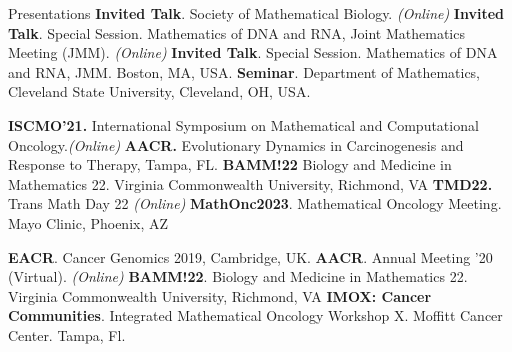 \begin{rubric}{Presentations}
\entry*[2021] \textbf{Invited Talk}. Society of Mathematical Biology. \emph{(Online)}
\entry*[2022] \textbf{Invited Talk}. Special Session. Mathematics of DNA and RNA, Joint Mathematics Meeting (JMM). \emph{(Online)}
\entry*[2023] \textbf{Invited Talk}. Special Session. Mathematics of DNA and RNA, JMM. Boston, MA, USA.
\entry*[2023] \textbf{Seminar}. Department of Mathematics, Cleveland State University, Cleveland, OH, USA.

\entry*[2021] \textbf{ISCMO'21. } International Symposium on Mathematical and Computational Oncology.\emph{(Online)}
\entry*[2022] \textbf{AACR. }Evolutionary Dynamics in Carcinogenesis and Response to Therapy, Tampa, FL. 
\entry*[2022] \textbf{BAMM!22} Biology and Medicine in Mathematics 22. Virginia Commonwealth University, Richmond, VA
\entry*[2022] \textbf{TMD22.} Trans Math Day 22 \emph{(Online)}
\entry*[2023] \textbf{MathOnc2023}. Mathematical Oncology Meeting. Mayo Clinic, Phoenix, AZ

\entry*[2019] \textbf{EACR}. Cancer Genomics 2019, Cambridge, UK. 
\entry*[2020] \textbf{AACR}. Annual Meeting '20 (Virtual). \emph{(Online)}
\entry*[2022] \textbf{BAMM!22}. Biology and Medicine in Mathematics 22. Virginia Commonwealth University, Richmond, VA
\entry*[2022] \textbf{IMOX: Cancer Communities}. Integrated Mathematical Oncology Workshop X. Moffitt Cancer Center. Tampa, Fl. 
\end{rubric}